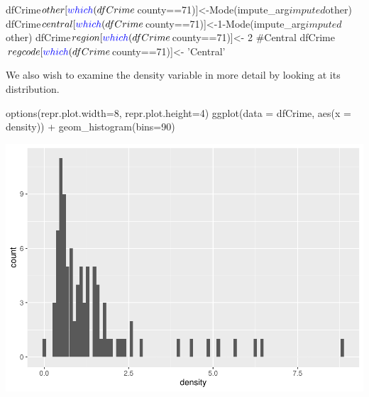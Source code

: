 \documentclass[]{article}
\newenvironment{Shaded}{}{}
\newcommand{\CommentTok}[1]{\textcolor[rgb]{0.00,0.50,0.00}{#1}}
\newcommand{\DataTypeTok}[1]{#1}
\newcommand{\DecValTok}[1]{#1}
\newcommand{\KeywordTok}[1]{\textcolor[rgb]{0.00,0.00,1.00}{#1}}
\newcommand{\NormalTok}[1]{#1}
\newcommand{\OperatorTok}[1]{#1}
\newcommand{\StringTok}[1]{\textcolor[rgb]{0.00,0.50,0.50}{#1}}
\begin{document}
\begin{Shaded}
\begin{Highlighting}[]
\NormalTok{dfCrime}\OperatorTok{$}\NormalTok{other[}\KeywordTok{which}\NormalTok{(dfCrime}\OperatorTok{$}\NormalTok{county}\OperatorTok{==}\DecValTok{71}\NormalTok{)]<-}\KeywordTok{Mode}\NormalTok{(impute_arg}\OperatorTok{$}\NormalTok{imputed}\OperatorTok{$}\NormalTok{other)}
\NormalTok{dfCrime}\OperatorTok{$}\NormalTok{central[}\KeywordTok{which}\NormalTok{(dfCrime}\OperatorTok{$}\NormalTok{county}\OperatorTok{==}\DecValTok{71}\NormalTok{)]<-}\DecValTok{1}\OperatorTok{-}\KeywordTok{Mode}\NormalTok{(impute_arg}\OperatorTok{$}\NormalTok{imputed}\OperatorTok{$}\NormalTok{other)}
\NormalTok{dfCrime}\OperatorTok{$}\NormalTok{region[}\KeywordTok{which}\NormalTok{(dfCrime}\OperatorTok{$}\NormalTok{county}\OperatorTok{==}\DecValTok{71}\NormalTok{)]<-}\StringTok{ }\DecValTok{2} \CommentTok{#Central}
\NormalTok{dfCrime}\OperatorTok{$}\NormalTok{regcode[}\KeywordTok{which}\NormalTok{(dfCrime}\OperatorTok{$}\NormalTok{county}\OperatorTok{==}\DecValTok{71}\NormalTok{)]<-}\StringTok{ 'Central'}
\end{Highlighting}
\end{Shaded}

We also wish to examine the density variable in more detail by looking
at its distribution.

\begin{Shaded}
\begin{Highlighting}[]
\KeywordTok{options}\NormalTok{(}\DataTypeTok{repr.plot.width=}\DecValTok{8}\NormalTok{, }\DataTypeTok{repr.plot.height=}\DecValTok{4}\NormalTok{)}
\KeywordTok{ggplot}\NormalTok{(}\DataTypeTok{data =}\NormalTok{ dfCrime, }\KeywordTok{aes}\NormalTok{(}\DataTypeTok{x =}\NormalTok{ density)) }\OperatorTok{+}\StringTok{ }
\StringTok{      }\KeywordTok{geom_histogram}\NormalTok{(}\DataTypeTok{bins=}\DecValTok{90}\NormalTok{)}
\end{Highlighting}
\end{Shaded}

\includegraphics{Bagnard_Gaustad_Hartman_Leung_Lab_3_files/figure-latex/unnamed-chunk-37-1.pdf}
\end{document}
